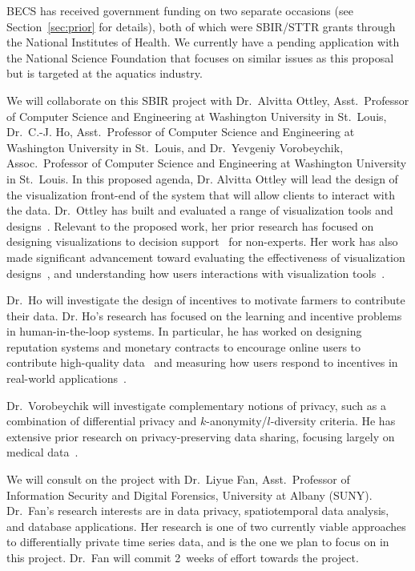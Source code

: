 BECS has received government funding on two separate occasions
(see Section~\ref{sec:prior} for details), both of which were SBIR/STTR
grants through the National Institutes of Health.  We currently
have a pending application with the National Science Foundation
that focuses on similar issues as this proposal but is targeted at
the aquatics industry.

We will collaborate on this SBIR project with Dr.~Alvitta Ottley,
Asst.~Professor of Computer Science and Engineering at Washington University
in St.~Louis, Dr.~C.-J. Ho, 
Asst.~Professor of Computer Science and Engineering at Washington University
in St.~Louis, and Dr.~Yevgeniy Vorobeychik, Assoc.~Professor of Computer Science and Engineering at Washington University
in St.~Louis.
In this proposed agenda, Dr. Alvitta Ottley will lead the design
of the visualization front-end of the system that will allow clients
to interact with the data.
Dr.~Ottley has built and evaluated a range of visualization tools
and designs~\cite{brown2014finding, hakone2017proact,ottley2015personality,peck2013using}. 
Relevant to the proposed work, her prior research has focused on designing visualizations to decision support~\cite{hakone2017proact,ottley2012visually,ottley2016improving} for non-experts. 
Her work has also made significant advancement toward evaluating the effectiveness of visualization designs~\cite{peck2013using,ziemkiewicz2013visualization}, and understanding how users interactions with visualization tools~\cite{brown2014finding,ottley2015personality}.  

Dr.~Ho will investigate the design of incentives to motivate farmers to
contribute their data. Dr. Ho's research has focused on the learning and incentive
problems in human-in-the-loop systems. In particular, he has worked on designing
reputation systems and monetary contracts to encourage online users
to contribute high-quality data~\cite{HSV14,HZVS12}
and measuring how users respond to incentives in 
real-world applications~\cite{hssv15}.

Dr.~Vorobeychik will investigate complementary notions of privacy,
such as a combination of differential privacy and
$k$-anonymity/$l$-diversity criteria.
He has extensive prior research on privacy-preserving data sharing,
focusing largely on medical data~\cite{Li17,Wan15,Wan17,Xia15}.


We will consult on the project with Dr.~Liyue Fan, Asst.~Professor
of Information Security and Digital Forensics, University at Albany (SUNY).
Dr.~Fan's research interests are in data privacy, spatiotemporal data
analysis, and database applications.  Her research is one of two
currently viable approaches to differentially private time series data,
and is the one we plan to focus on in this project.
Dr.~Fan will commit 2~weeks of effort towards the project.

